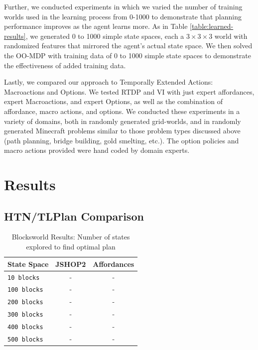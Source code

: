\documentclass[conference]{IEEEtran}
\begin{document}
Further, we conducted experiments in which we varied the number of training worlds
used in the learning process from 0-1000 to demonstrate that planning
performance improves as the agent learns more. As in Table \ref{table:learned-results}, we generated 0 to 1000 simple state
spaces, each a $3\times3\times3$ world with randomized features that mirrored the agent's actual state space. We then solved
the OO-MDP with training data of 0 to 1000 simple state spaces to demonstrate the effectiveness of added training data.

Lastly, we compared our approach to Temporally Extended Actions: Macroactions and Options. We tested RTDP and VI with just expert affordances,
expert Macroactions, and expert Options, as well as the combination of affordance, macro actions, and options. We conducted these experiments in a variety of domains, both in randomly generated grid-worlds, and in randomly generated Minecraft problems similar to those problem types discussed above (path planning, bridge building, gold smelting, etc.). The option policies and macro actions provided were hand coded by domain experts.

\section{Results}
\label{sec:results}

\subsection{HTN/TLPlan Comparison}


\begin{table}[H]
\centering
\begin{tabular}{ l || c c }
  State Space 			& JSHOP2 	& Affordances \\ \hline
  \texttt{10 blocks}  		& 	-		&	-	\\
  \texttt{100 blocks}  		& 	-		&	-	\\
  \texttt{200 blocks}  		& 	-		&	-	\\
  \texttt{300 blocks}  		& 	-		&	-	\\
  \texttt{400 blocks}  		& 	-		&	-	\\
  \texttt{500 blocks}  		& 	-		&	-	\\
\end{tabular}
\caption{Blocksworld Results: Number of states explored to find optimal plan}
\label{table:minecraft_results_bellman}
\end{table}
\end{document}
